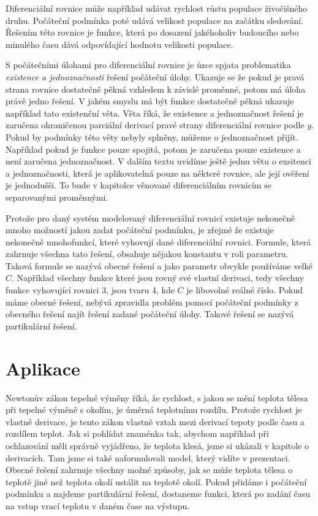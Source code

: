 \documentclass[12pt]{article}
\begin{document}
Diferenciální rovnice může například udávat rychlost růstu populace živočišného druhu. Počáteční podmínka poté udává velikost populace na začátku sledování. Řešením této rovnice je funkce, která po dosazení jakéhokoliv budoucího nebo minulého času dává odpovídající hodnotu velikosti populace. 

S počátečními úlohami pro diferenciální rovnice je úzce spjata problematika \textit{existence a jednoznačnosti} řešení počáteční úlohy. Ukazuje se že pokud je pravá strana rovnice dostatečně pěkná vzhledem k závislé proměnné, potom má úloha právě jedno řešení. V jakém smyslu má být funkce dostatečně pěkná ukazuje například tato existenční věta. Věta říká, že existence a jednoznačnost řešení je zaručena ohraničenou parciální derivací pravé strany diferenciální rovnice podle $y$. Pokud by podmínky této věty nebyly splněny, můžeme o jednoznačnost přijít. Například pokud je funkce pouze spojitá, potom je zaručena pouze existence a není zaručena jednoznačnost. V dalším textu uvidíme ještě jednu větu o exsitenci a jednoznačnosti, která je aplikovatelná pouze na některé rovnice, ale její ověření je jednodušši. To bude v kapitolce věnované diferenciálním rovnicím se separovanými proměnnými. 

Protože pro daný systém modelovaný diferenciální rovnicí existuje nekonečně mnoho možností jakou zadat počáteční podmínku, je zřejmé že existuje nekonečně mnohofunkcí, které vyhovují dané diferenciální rovnici. Formule, která zahrnuje všechna tato řešení, obsahuje nějakou konstantu v roli parametru. Taková formule se nazývá obecné řešení a jako parametr obvykle používáme velké $C$. Například všechny funkce které jsou rovný své vlastní derivaci, tedy všechny funkce vyhovující rovnici 3, jsou tvaru 4, kde $C$ je libovolné reálné číslo. Pokud máme obecné řešení, nebývá zpravidla problém pomocí počáteční podmínky z obecného řešení najít řešení zadané počáteční úlohy. Takové řešení se nazývá partikulární řešení.

\section*{Aplikace}

Newtonův zákon tepelné výměny říká, že rychlost, s jakou se mění teplota tělesa při tepelné výměně s okolím, je úměrná teplotnímu rozdílu. Protože rychlost je vlastně derivace, je tento zákon vlastně vztah mezi derivací tepoty podle času a rozdílem teplot. Jak si pohlídat znaménka tak, abychom například při ochlazování měli správně vyjádřeno, že teplota klesá, jsme si ukázali v kapitole o derivacích. Tam jsme si také naformulovali model, který vidíte v prezentaci. Obecné řešení zahrnuje všechny možné způsoby, jak se může teplota tělesa o teplotě jiné než teplota okolí ustálit na teplotě okolí. Pokud přidáme i počáteční podmínku a najdeme partikulární řešení, dostaneme funkci, která po zadání času na vstup vrací teplotu v daném čase na výstupu.
\end{document}
